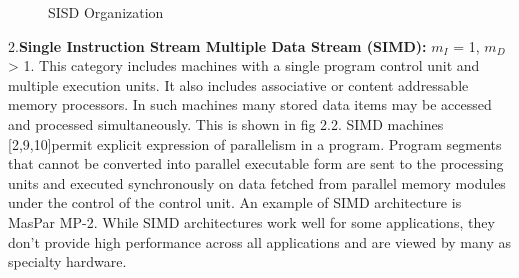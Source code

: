 \begin{figure}[ht]
{\centering {} \par}
\caption{SISD Organization}
\end{figure}

2.{\bf{Single Instruction Stream Multiple Data Stream (SIMD):}} $m_{I}$ = 1, $m_{D}$ > 1. This category includes machines with a single program control
unit and multiple execution units. It also includes associative or content addressable memory processors. In such machines many stored data items may be
accessed and processed simultaneously. This is shown in fig 2.2. SIMD machines [2,9,10]permit explicit expression of parallelism in a program. Program segments
that
cannot be converted into parallel executable form are sent to the processing units and executed synchronously on data fetched from parallel memory modules
under the control of the control unit. An example of SIMD architecture is MasPar MP-2. While SIMD architectures work well for some applications, they don't
provide high performance across all applications and are viewed by many as specialty hardware.
